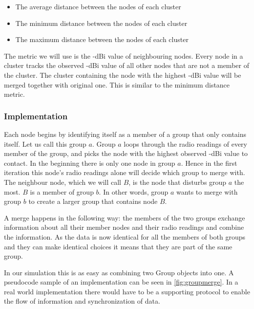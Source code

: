 \begin{itemize}
	\itemsep0em 
	\item The average distance between the nodes of each cluster
	\item The minimum distance between the nodes of each cluster
	\item The maximum distance between the nodes of each cluster
\end{itemize}

The metric we will use is the -dBi value of neighbouring nodes. Every node in a cluster tracks the observed -dBi value of all other nodes that are not a member of the cluster.
The cluster containing the node with the highest -dBi value will be merged together with original one. This is similar to the minimum distance metric. 

\subsubsection{Implementation}
Each node begins by identifying itself as a member of a group that only contains itself.  Let us call this group $a$.
Group $a$ loops through the radio readings of every member of the group, and picks the node with the highest observed -dBi value
to contact. In the beginning there is only one node in group $a$. Hence in the first iteration this node's radio readings alone will decide which group to merge with. 
The neighbour node, which we will call $B$, is the node that disturbs group $a$ the most. $B$ is a member of group $b$.
In other words, group $a$ wants to merge with group $b$ to create a larger group that contains node $B$.

A merge happens in the following way: the members of the two groups exchange information about all their member nodes and their radio readings and combine the information.
As the data is now identical for all the members of both groups and they can make identical choices it means that they are part of the same group. 

In our simulation this is as easy as combining two Group objects into one. A pseudocode sample of an implementation can be seen in \ref{fig:groupmerge}.
In a real world implementation there would have to be a supporting protocol to 
enable the flow of information and synchronization of data. 

